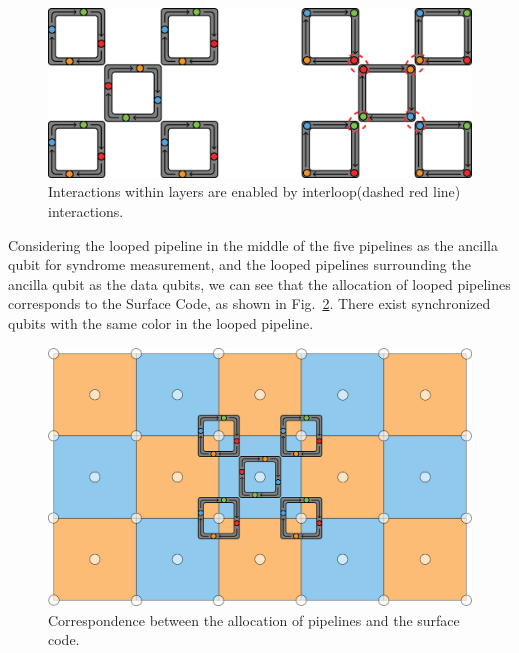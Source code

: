 \documentclass[a4paper,11pt]{ltjsarticle}
\begin{document}
{{        \begin{figure}[h]
            \centering
            \includegraphics[scale=0.30]{figure/looped_pipeline_surface_code.eps}
            \vspace{0pt}\caption{Interactions within layers are enabled by interloop(dashed red line) interactions.}
            \label{looped_pipeline_surface_code}
            \vspace{-10pt}
        \end{figure}

        Considering the looped pipeline in the middle of the five pipelines as the ancilla qubit for syndrome measurement, and the looped pipelines surrounding the ancilla qubit as the data qubits, we can see that the allocation of looped pipelines corresponds to the Surface Code, as shown in Fig.~\ref{looped_pipeline_weak_surface_code}. There exist synchronized qubits with the same color in the looped pipeline.

        \begin{figure}[h]
            \centering
            \includegraphics[scale=0.20]{figure/looped_pipeline_weak_surface_code.eps}
            \vspace{0pt}\caption{Correspondence between the allocation of pipelines and the surface code.}
            \label{looped_pipeline_weak_surface_code}
            \vspace{-10pt}
        \end{figure} 

}}
\end{document}
